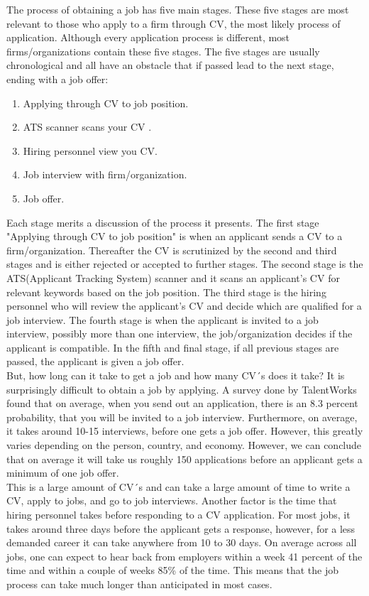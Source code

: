 The process of obtaining a job has five main stages.
These five stages are most relevant to those who apply to a firm through CV, the most likely process of application.
Although every application process is different, most firms/organizations contain these five stages.
The five stages are usually chronological and all have an obstacle that if passed lead to the next stage, ending with a job offer:
\begin{enumerate}
   \item Applying through CV to job position.
   \item ATS scanner scans your CV \cite{ATS-scanner}.
   \item Hiring personnel view you CV.
   \item Job interview with firm/organization.
   \item Job offer.\cite{Process_steps_unemployment}
\end{enumerate}
Each stage merits a discussion of the process it presents.
The first stage "Applying through CV to job position" is when an applicant sends a CV to a firm/organization.
Thereafter the CV is scrutinized by the second and third stages and is either rejected or accepted to further stages.
The second stage is the ATS(Applicant Tracking System) scanner and it scans an applicant's CV for relevant keywords based on the job position.
The third stage is the hiring personnel who will review the applicant's CV and decide which are qualified for a job interview.
The fourth stage is when the applicant is invited to a job interview, possibly more than one interview, the job/organization decides if the applicant is compatible.
In the fifth and final stage, if all previous stages are passed, the applicant is given a job offer. \\
 
But, how long can it take to get a job and how many CV´s does it take?
It is surprisingly difficult to obtain a job by applying.
A survey done by TalentWorks found that on average, when you send out an application, there is an 8.3 percent probability, that you will be invited to a job interview. 
Furthermore, on average, it takes around 10-15 interviews, before one gets a job offer. 
However, this greatly varies depending on the person, country, and economy.
However, we can conclude that on average it will take us roughly 150 applications before an applicant gets a minimum of one job offer.\cite{HR-sales} \\

This is a large amount of CV´s and can take a large amount of time to write a CV, apply to jobs, and go to job interviews.
Another factor is the time that hiring personnel takes before responding to a CV application.
For most jobs, it takes around three days before the applicant gets a response, however, for a less demanded career it can take anywhere from 10 to 30 days.\cite{HR-sales}
On average across all jobs, one can expect to hear back from employers within a week 41 percent of the time and within a couple of weeks 85\% of the time.
This means that the job process can take much longer than anticipated in most cases. \\

